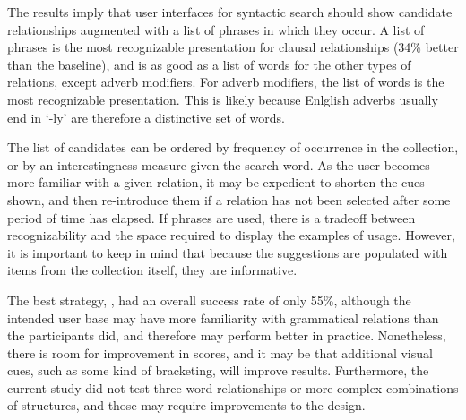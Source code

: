 

The results imply that user interfaces for syntactic search should show candidate relationships augmented with a list of phrases in which they occur. A list of phrases is the most recognizable presentation for clausal relationships (34\% better than the baseline), and is as good as a list of words for the other types of relations, except adverb modifiers. For adverb modifiers, the list of words is the most recognizable presentation. This is likely because Enlglish adverbs usually end in `-ly' are therefore a distinctive set of words.

The list of candidates can be ordered by frequency of occurrence in the collection, or by an interestingness measure given the search word.  As the user becomes more familiar with a given relation, it may  be expedient to shorten the cues shown, and then re-introduce them if a relation has not been selected after some period of time has elapsed. If phrases are used, there is a tradeoff between recognizability and the space required to display the examples of usage. However, it is important to keep in mind that because the suggestions are populated with items from the collection itself, they are informative.


The best  strategy, , had an overall success rate of only 55\%, although the intended user base may have more familiarity with grammatical relations than the participants did, and therefore may perform better in practice.
Nonetheless, there is room for improvement in scores, and it may be that additional visual cues, such as some kind of bracketing, will improve results.  Furthermore, the current study did not test three-word relationships or more complex combinations of structures, and those may require improvements to the design.